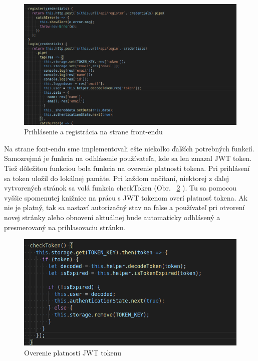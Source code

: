 \begin{figure}[H]
    \centering
    \includegraphics[scale=0.40]{img/imp/login_front.png}
    \caption{Prihlásenie a registrácia na strane front-endu}
    \label{fig:login_front}
\end{figure}

\indent Na strane font-endu sme implementovali ešte niekoľko ďalších potrebných funkcií. Samozrejmá je funkcia na odhlásenie používateľa, kde sa len zmazal JWT token. Tiež dôležitou funkciou bola funkcia na overenie platnosti tokena. Pri prihlásení sa token uložil do lokálnej pamäte. Pri každom načítaní, niektorej z ďalej vytvorených stránok sa volá funkcia checkToken (Obr. ~\ref{fig:checkjwt} ). Tu sa pomocou vyššie spomenutej knižnice na prácu s JWT tokenom overí platnosť tokena. Ak nie je platný, tak sa nastaví autorizačný stav na false a používateľ pri otvorení novej stránky alebo obnovení aktuálnej bude automaticky odhlásený a presmerovaný na prihlasovaciu stránku. 

\begin{figure}[H]
    \centering
    \includegraphics[scale=0.50]{img/imp/checkjwt.png}
    \caption{Overenie platnosti JWT tokenu}
    \label{fig:checkjwt}
\end{figure}

